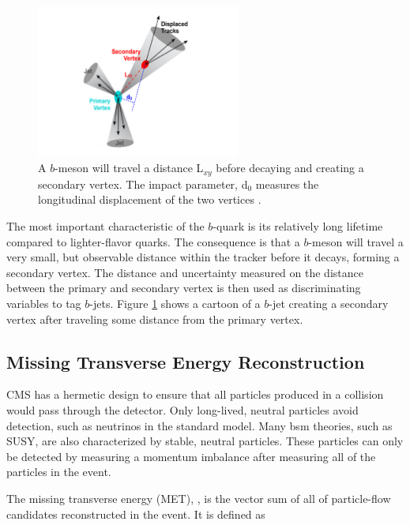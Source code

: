 \begin{figure}[h]
   \centering
  \includegraphics[width=0.6\textwidth]{Figures/Reconstruction_Diagrams/Jets__bTagging.pdf}
  \caption{A $b$-meson will travel a distance L$_{xy}$ before decaying
  and creating a secondary vertex.  The impact parameter, d$_{0}$
  measures the longitudinal displacement of the two vertices
  \cite{CMS:BTaggingCartoon}. } \label{fig:bTagging}
\end{figure}

\par The most important characteristic of the $b$-quark is its
relatively long lifetime compared to lighter-flavor quarks.  The
consequence is that a $b$-meson will travel a very small, but
observable distance within the tracker before it decays, forming a
secondary vertex.  The distance and uncertainty measured on the
distance between the primary and secondary vertex is then used as
discriminating variables to tag $b$-jets.  Figure \ref{fig:bTagging}
shows a cartoon of a $b$-jet creating a secondary vertex after
traveling some distance from the primary vertex.   

\subsection{Missing Transverse Energy Reconstruction}

\par CMS has a hermetic design to ensure that all particles produced
in a collision would pass through the detector.  Only long-lived,
neutral particles avoid detection, such as neutrinos in the standard
model.  Many \acrshort{bsm} theories, such as SUSY, are also
characterized by stable, neutral particles.  These particles can only
be detected by measuring a momentum imbalance after measuring all of
the particles in the event.

\par The missing transverse energy (MET), \ETslash, is the vector sum of
all of particle-flow candidates reconstructed in the event.  It is
defined as 

